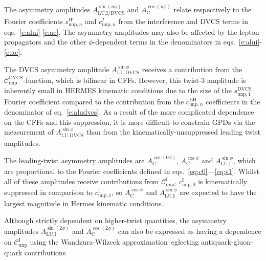 The asymmetry amplitudes $A_{\textrm{LU,I/DVCS}}^{\sin(n\phi)}$ and
$A_{\textrm{C}}^{\cos(n\phi)}$ relate respectively to the Fourier
coefficients $s_{\textrm{unp},n}^{W}$ and $c_{\textrm{unp},n}^{I}$ from the interference and DVCS terms in eqs.~\ref{e:alui}-\ref{e:ac}. The asymmetry amplitudes
may also be affected by the lepton propagators and the other
$\phi$-dependent terms in the denominators in
eqs.~\ref{e:alui}-\ref{e:ac}.

The DVCS asymmetry amplitude $A^{\sin\phi}_{\textrm{LU,DVCS}}$ receives a
contribution from the $\mathcal{C}_{\textrm{unp}}^{\textrm{DVCS}}$-function,
which is bilinear in CFFs. However, this twist-3 amplitude is inherently small in HERMES kinematic conditions due to the size of the $s_{\textrm{unp},1}^{\textrm{DVCS}}$ Fourier coefficient compared to the contribution from the $c_{\textrm{unp},n}^{\textrm{BH}}$ coefficients in the denominator of eq.~\ref{e:aludvcs}. As a result of the more complicated dependence on the CFFs and this suppression, it
is more difficult to constrain GPDs via the measurement of $A^{\sin\phi}_{\textrm{LU,DVCS}}$ than from the kinematically-unsuppressed leading twist amplitudes.

The leading-twist asymmetry amplitudes are $A_{\textrm{C}}^{\cos(0\phi)}$, $A_{\textrm{C}}^{\cos\phi}$ and $A_{\textrm{LU,I}}^{\sin\phi}$, which are proportional to the Fourier coefficients  defined in eqs.~\ref{eq:c0}---\ref{eq:s1}. Whilst all of these amplitudes receive contributions from $\mathcal{C}_{\textrm{unp}}^{\textrm{I}}$, $c_{\textrm{unp},0}^{\textrm{I}}$ is kinematically suppressed in comparison to $c_{\textrm{unp},1}^{\textrm{I}}$, so $A_{\textrm{C}}^{\cos\phi}$ and $A_{\textrm{LU,I}}^{\sin\phi}$ are expected to have the largest magnitude in H{\sc ermes} kinematic conditions.

Although strictly dependent on higher-twist quantities, the asymmetry amplitudes $A_{\textrm{LU},\textrm{I}}^{\sin(2\phi)}$ and $A^{\cos(2\phi)}_{\textrm{C}}$ can also be expressed as having a dependence on $\mathcal{C}_{\textrm{unp}}^{\textrm{I}}$ using the Wandzura-Wilzcek approximation~\cite{Wan}eglecting antiquark-gluon-quark contributions

